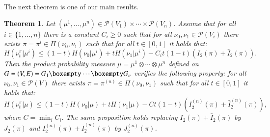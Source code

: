 \documentclass[11pt]{amsart}
\newtheorem{thm}[equation]{Theorem}
\numberwithin{equation}{section}
\begin{document}
The next theorem is one of our main results.
\begin{thm} \label{th:main}
Let $(\mu^1,\ldots,\mu^n) \in \mathcal{P}(V_1) \times\cdots\times \mathcal{P}(V_n)$.
Assume that for all $i\in \{1,\ldots,n\}$ there is a constant $C_i\geq 0$ such that for all $\nu_0,\nu_1 \in \mathcal{P}(V_i)$ there exists $\pi = \pi^i\in \Pi(\nu_0,\nu_1)$ such that for all $t\in [0,1]$ it holds that:
$$H(\nu_t^\pi | \mu^i) \leq (1-t)H(\nu_0 | \mu^{i}) + tH(\nu_1 | \mu^{i}) - C_it(1-t)(I_2(\pi)+\bar{I}_2(\pi)).$$
Then the product probability measure $\mu=\mu^1\otimes\cdots\otimes\mu^n$ defined on $G=(V,E)=G_1\boxempty\cdots\boxempty G_n$ verifies the following property: 
for all $\nu_0,\nu_1 \in \mathcal{P}(V)$ there exists $\pi = \pi^{(n)}\in \Pi(\nu_0,\nu_1)$ such that for all $t\in [0,1]$ it holds that:
$$H(\nu_t^\pi | \mu) \leq (1-t)H(\nu_0 | \mu) + tH(\nu_1 | \mu) - Ct(1-t)(I_2^{(n)}(\pi)+\bar{I}^{(n)}_2(\pi)),$$
where $C=\min_i C_i.$
The same proposition holds replacing $I_2(\pi)+\bar{I}_2(\pi)$ by $J_2(\pi)$ and $I_2^{(n)}(\pi)+\bar{I}^{(n)}_2(\pi)$ by $J_2^{(n)}(\pi)$.
\end{thm}
\end{document}
